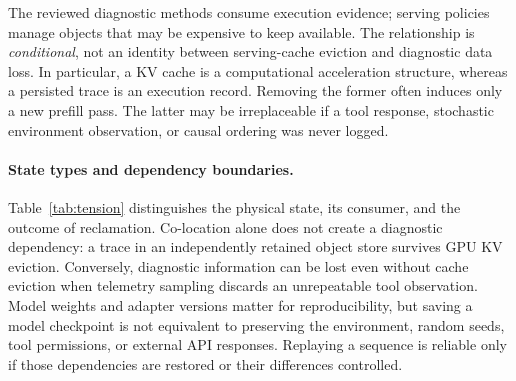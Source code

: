 The reviewed diagnostic methods consume execution evidence; serving policies manage objects that may be expensive to keep available. The relationship is \emph{conditional}, not an identity between serving-cache eviction and diagnostic data loss. In particular, a KV cache is a computational acceleration structure, whereas a persisted trace is an execution record. Removing the former often induces only a new prefill pass. The latter may be irreplaceable if a tool response, stochastic environment observation, or causal ordering was never logged.

\paragraph*{State types and dependency boundaries.}
Table~\ref{tab:tension} distinguishes the physical state, its consumer, and the outcome of reclamation. Co-location alone does not create a diagnostic dependency: a trace in an independently retained object store survives GPU KV eviction. Conversely, diagnostic information can be lost even without cache eviction when telemetry sampling discards an unrepeatable tool observation. Model weights and adapter versions matter for reproducibility, but saving a model checkpoint is not equivalent to preserving the environment, random seeds, tool permissions, or external API responses. Replaying a sequence is reliable only if those dependencies are restored or their differences controlled.

